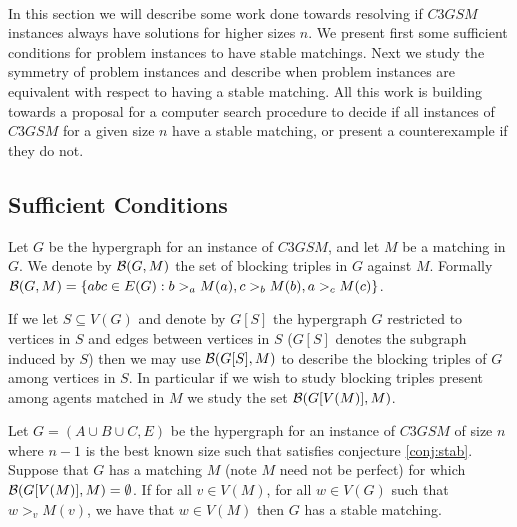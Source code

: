 \paragraph{}
In this section we will describe some work done towards resolving if $C3GSM$ instances always have solutions for higher sizes $n$. We present first some sufficient conditions for problem instances to have stable matchings. Next we study the symmetry of problem instances and describe when problem instances are equivalent with respect to having a stable matching. All this work is building towards a proposal for a computer search procedure to decide if all instances of $C3GSM$ for a given size $n$ have a stable matching, or present a counterexample if they do not.
\subsection{Sufficient Conditions}
\begin{definition}
Let $G$ be the hypergraph for an instance of $C3GSM$, and let $M$ be a matching in $G$. We denote by $\mathcal{B}(G,M)$ the set of blocking triples in $G$ against $M$. Formally $\mathcal{B}(G,M) = \{abc \in E(G): b>_a M(a), c>_b M(b), a>_c M(c)\}$.
\end{definition}
\begin{note}
If we let $S \subseteq V(G)$ and denote by $G[S]$ the hypergraph $G$ restricted to vertices in $S$ and edges between vertices in $S$ ($G[S]$ denotes the subgraph induced by $S$) then we may use $\mathcal{B}(G[S],M)$ to describe the blocking triples of $G$ among vertices in $S$. In particular if we wish to study blocking triples present among agents matched in $M$ we study the set $\mathcal{B}(G[V(M)], M)$.
\end{note}
\begin{lemma}\label{lemma:partialstab}
Let $G = (A\cup B \cup C, E)$ be the hypergraph for an instance of $C3GSM$ of size $n$ where $n-1$ is the best known size such that  satisfies conjecture \ref{conj:stab}. Suppose that $G$ has a matching $M$ (note $M$ need not be perfect) for which $\mathcal{B}(G[V(M)],M) = \emptyset$. If for all  $v \in V(M)$, for all $w \in V(G)$ such that $w >_v M(v)$, we have that $w \in V(M)$ then $G$ has a stable matching.
\end{lemma}
